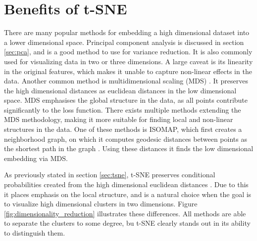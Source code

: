 \documentclass[a4paper]{memoir}
\theoremstyle{plain}
\theoremstyle{definition}
\theoremstyle{remark}
\begin{document}
\section{Benefits of t-SNE}
There are many popular methods for embedding a high dimensional dataset into a lower dimensional space.
Principal component analysis is discussed in section \ref{sec:pca}, and is a good method to use for variance reduction.
It is also commonly used for visualizing data in two or three dimensions.
A large caveat is its linearity in the original features, which makes it unable to capture non-linear effects in the data.
Another common method is multidimensional scaling (MDS) \cite{hastie}.
It preserves the high dimensional distances as euclidean distances in the low dimensional space.
MDS emphasises the global structure in the data, as all points contribute significantly to the loss function.
There exists multiple methods extending the MDS methodology, making it more suitable for finding local and non-linear structures in the data. 
One of these methods is ISOMAP, which first creates a neighborhood graph, on which it computes geodesic distances between points as the shortest path in the graph \cite{tenenbaum}.
Using these distances it finds the low dimensional embedding via MDS.

As previously stated in section \ref{sec:tsne}, t-SNE preserves conditional probabilities created from the high dimensional euclidean distances \cite{hinton}.
Due to this it places emphasis on the local structure, and is a natural choice when the goal is to visualize high dimensional clusters in two dimensions.
Figure \ref{fig:dimensionality_reduction} illustrates these differences.
All methods are able to separate the clusters to some degree, bu t-SNE clearly stands out in its ability to distinguish them.
\end{document}
